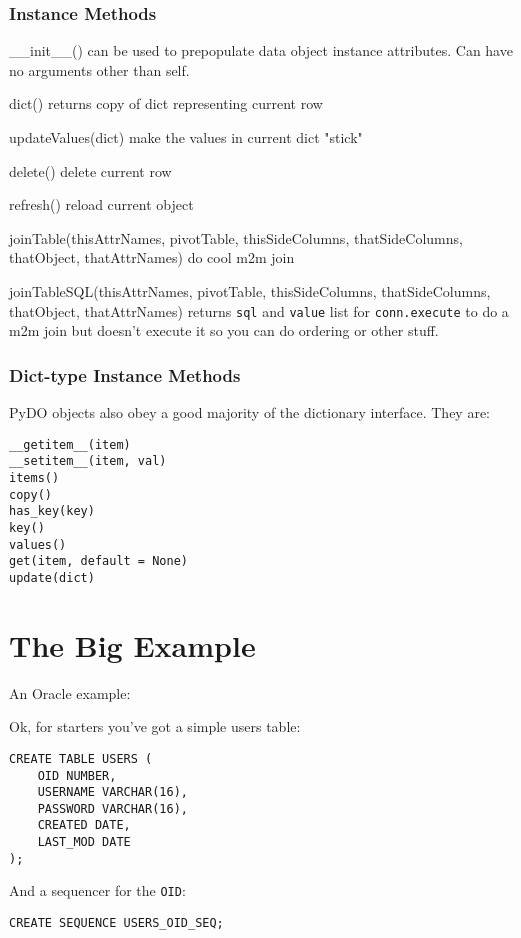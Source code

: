 \documentclass[titlepage]{manual}
\begin{document}
\subsection{Instance Methods}
\begin{argdesc}
\item[__init__()] can be used to prepopulate data object instance attributes.  Can have no arguments other than self.
\item[dict()] returns copy of dict representing current row
\item[updateValues(dict)] make the values in current dict "stick"
\item[delete()] delete current row
\item[refresh()] reload current object
\item[joinTable(thisAttrNames, pivotTable, thisSideColumns,
thatSideColumns, thatObject, thatAttrNames)] do cool m2m join
\item[joinTableSQL(thisAttrNames, pivotTable, thisSideColumns,
thatSideColumns, thatObject, thatAttrNames)] returns \texttt{sql} and
\texttt{value} list for \texttt{conn.execute} to do a m2m join but
doesn't execute it so you can do ordering or other stuff.
\end{argdesc}


\subsection{Dict-type Instance Methods}
PyDO objects also obey a good majority of the dictionary interface.
They are:
\begin{verbatim}
__getitem__(item)
__setitem__(item, val)
items()
copy()
has_key(key)
key()
values()
get(item, default = None)
update(dict)
\end{verbatim}


\chapter{The Big Example}
An Oracle example:

Ok, for starters you've got a simple users table:

\begin{verbatim}
CREATE TABLE USERS (
    OID NUMBER,
    USERNAME VARCHAR(16),
    PASSWORD VARCHAR(16),
    CREATED DATE,
    LAST_MOD DATE
);
\end{verbatim}

And a sequencer for the \texttt{OID}:

\begin{verbatim}
CREATE SEQUENCE USERS_OID_SEQ;
\end{verbatim}
\end{document}
